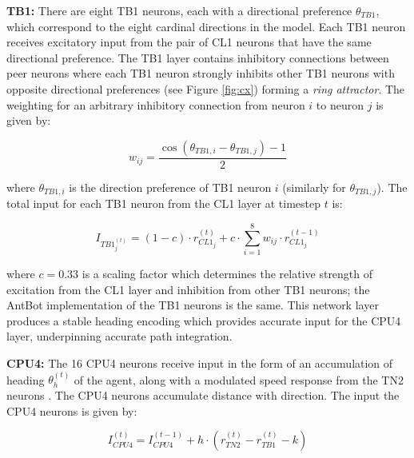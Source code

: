 \documentclass[a4paper,11pt,twoside,openright]{article}
\begin{document}
\textbf{TB1:}
There are eight TB1 neurons, each with a directional preference $\theta_{TB1}$,
which correspond to the eight cardinal directions in the model. Each TB1 neuron
receives excitatory input from the pair of CL1 neurons that have the same
directional preference. The TB1 layer contains inhibitory connections between
peer neurons where each TB1 neuron strongly inhibits other TB1 neurons with
opposite directional preferences (see Figure \ref{fig:cx}) forming a
\textit{ring attractor}\cite{Stone2017}. The weighting for an arbitrary
inhibitory connection from neuron $i$ to neuron $j$ is given by:

\begin{equation}
  w_{ij} =
  \frac{\cos (\theta_{TB1,i} - \theta_{TB1,j}) - 1}{2}
\end{equation}

where $\theta_{TB1,i}$ is the direction preference of TB1 neuron $i$ (similarly
for $\theta_{TB1,j}$). The total input for each TB1 neuron from the CL1 layer
at timestep $t$ is:

\begin{equation}
  I_{TB1_{j}^{(t)}} =
  (1 - c) \cdot r_{CL1_j}^{(t)} + c \cdot \sum_{i = 1}^{8} w_{ij}
  \cdot r_{CL1_j}^{(t - 1)}
\end{equation}

where $c = 0.33$ is a scaling factor which determines the relative strength
of excitation from the CL1 layer and inhibition from other TB1 neurons;
the AntBot implementation of the TB1 neurons is the same. This
network layer produces a stable heading encoding which provides accurate
input for the CPU4 layer, underpinning accurate path integration.
\newline
\par

\textbf{CPU4:}
The 16 CPU4 neurons receive input in the form of an accumulation of
heading $\theta_h^{(t)}$ of the agent, along with a modulated speed response
from the TN2 neurons \cite{Stone2017}. The CPU4 neurons accumulate distance with
direction. The input the CPU4 neurons is given by:

\begin{equation}
  \label{eq:cpu4update}
I_{CPU4}^{(t)} = I_{CPU4}^{(t - 1)} + h \cdot (r_{TN2}^{(t)} - r_{TB1}^{(t)} - k)
\end{equation}
\end{document}

